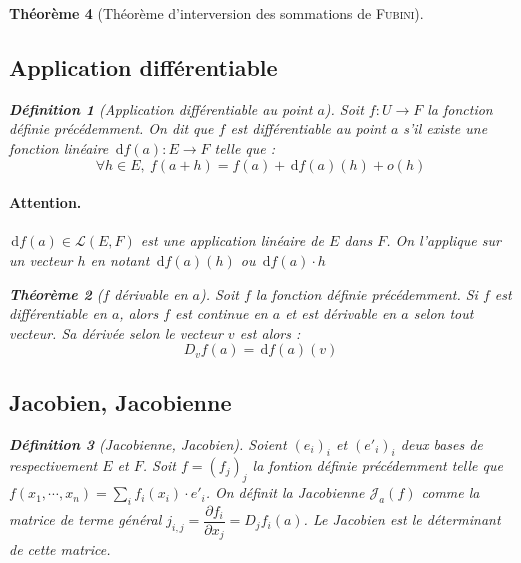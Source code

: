 \documentclass[11pt,a4paper]{report}
\newtheorem{theorem}{Théorème}[chapter]
\theoremstyle{definition}
\newtheorem{dfn}[theorem]{Définition}
\begin{document}
\begin{theorem}[Théorème d'interversion des sommations de \textsc{Fubini}]
{{\subsection{Application différentiable} %
\label{sub:application_differentiable}
\begin{dfn}[Application différentiable au point $a$]
    Soit $f:U\to F$ la fonction définie précédemment.\newline
    On dit que $f$ est \emph{différentiable} au point $a$ s'il existe une fonction linéaire $\,\mathrm{d} f(a) : E \to F$ telle que :
    \begin{equation}
    \forall h \in E, \ f(a + h) = f(a) + \,\mathrm{d} f(a)(h) + o(h)
    \end{equation}
\end{dfn}
\paragraph{Attention.} $\,\mathrm{d} f(a) \in \mathscr{L}(E,F)$ est une application linéaire de $E$ dans $F$. On l'applique sur un vecteur $h$ en notant $\,\mathrm{d} f(a)(h)$ ou $\,\mathrm{d} f(a)\cdot h$
\begin{theorem}[$f$ dérivable en $a$]
     Soit $f$ la fonction définie précédemment. \newline
     Si $f$ est différentiable en $a$, alors $f$ est continue en $a$ et est dérivable en $a$ selon tout vecteur. Sa dérivée selon le vecteur $v$ est alors : 
     \begin{equation}
     D_v f(a) = \,\mathrm{d} f(a)(v)
     \end{equation}
\end{theorem}

\subsection{Jacobien, Jacobienne} %
\label{sub:jacobien_jacobienne}

\begin{dfn}[Jacobienne, Jacobien]
  Soient $(e_i)_i$ et $(e'_i)_i$ deux bases de respectivement $E$ et $F$.\newline
  Soit $f=(f_j)_j$ la fontion définie précédemment telle que $f(x_1,\cdots,x_n) = \sum_i f_i (x_i)\cdot e'_i$. 
On définit la \emph{Jacobienne} $\mathcal{J}_a(f)$ comme la matrice de terme général $j_{i,j}=\dfrac{\partial f_i}{\partial x_j}=D_jf_i(a)$. \newline
Le \emph{Jacobien} est le déterminant de cette matrice.
\end{dfn}

}}
\end{theorem}
\end{document}
